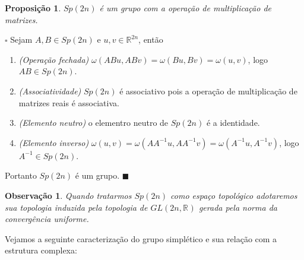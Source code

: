 \documentclass[12pt]{book}
\newtheorem{observacao}[teorema]{Observação}
\newtheorem{proposicao}[teorema]{Proposição}
\newenvironment{prova}[1]{$\square$ #1}{\hfill$\blacksquare$}
\newcommand{\generalgroup}[2]{GL(#1, #2)}
\newcommand{\generalgroupreal}[1]{\generalgroup{#1}{\real{}}}
\newcommand{\gruposimpletico}[1]{Sp(#1)}
\newcommand{\real}[1]{\mathbb{R}^{#1}}
\begin{document}
	\begin{proposicao}\label{proposicao_grupo_simpletico_estrutura_grupo}
		$\gruposimpletico{2n}$ é um grupo com a operação de multiplicação de matrizes.
	\end{proposicao}
	\begin{prova}
		Sejam $A,B \in \gruposimpletico{2n}$ e $u,v \in \real{2n}$, então
		\begin{enumerate}
			\item \textit{(Operação fechada)} $\omega(ABu, ABv) = \omega(Bu, Bv) = \omega(u,v)$, logo $AB \in \gruposimpletico{2n}$.
			\item \textit{(Associatividade)} $\gruposimpletico{2n}$ é associativo pois a operação de multiplicação de matrizes reais é associativa.
			\item \textit{(Elemento neutro)} o elementro neutro de $\gruposimpletico{2n}$ é a identidade.
			\item \textit{(Elemento inverso)} $\omega(u, v)=\omega(AA^{-1}u, AA^{-1}v) = \omega(A^{-1}u, A^{-1}v)$, logo $A^{-1} \in \gruposimpletico{2n}$. 
		\end{enumerate}
		Portanto $\gruposimpletico{2n}$ é um grupo.
	\end{prova}
	
	\begin{observacao}
		Quando tratarmos $\gruposimpletico{2n}$ como espaço topológico adotaremos sua topologia induzida pela topologia de $\generalgroupreal{2n}$ gerada pela norma da convergência uniforme.
	\end{observacao}
	
	Vejamos a seguinte caracterização do grupo simplético e sua relação com a estrutura complexa:
	
\end{document}
